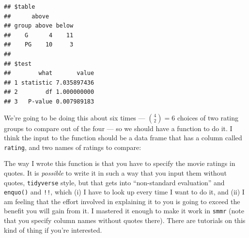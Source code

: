 \documentclass[]{tufte-book}
\newenvironment{Shaded}{}{}
\newcommand{\ControlFlowTok}[1]{\textcolor[rgb]{0.00,0.44,0.13}{\textbf{#1}}}
\newcommand{\DecValTok}[1]{\textcolor[rgb]{0.25,0.63,0.44}{#1}}
\newcommand{\KeywordTok}[1]{\textcolor[rgb]{0.00,0.44,0.13}{\textbf{#1}}}
\newcommand{\NormalTok}[1]{#1}
\newcommand{\OperatorTok}[1]{\textcolor[rgb]{0.40,0.40,0.40}{#1}}
\newcommand{\StringTok}[1]{\textcolor[rgb]{0.25,0.44,0.63}{#1}}
\theoremstyle{definition}
\theoremstyle{definition}
\theoremstyle{definition}
\theoremstyle{remark}
\begin{document}
\begin{Shaded}
\end{Shaded}

\begin{verbatim}
## $table
##      above
## group above below
##    G      4    11
##    PG    10     3
## 
## $test
##        what       value
## 1 statistic 7.035897436
## 2        df 1.000000000
## 3   P-value 0.007989183
\end{verbatim}

We're going to be doing this about six times --- \({4 \choose 2}=6\)
choices of two rating groups to compare out of the four --- so we should
have a function to do it. I think the input to the function should be a
data frame that has a column called \texttt{rating}, and two names of
ratings to compare:

\begin{Shaded}
\end{Shaded}

The way I wrote this function is that you have to specify the movie
ratings in quotes. It is \emph{possible} to write it in such a way that
you input them without quotes, \texttt{tidyverse} style, but that gets
into ``non-standard evaluation'' and \texttt{enquo()} and \texttt{!!},
which (i) I have to look up every time I want to do it, and (ii) I am
feeling that the effort involved in explaining it to you is going to
exceed the benefit you will gain from it. I mastered it enough to make
it work in \texttt{smmr} (note that you specify column names without
quotes there). There are tutorials on this kind of thing if you're
interested.
\end{document}
